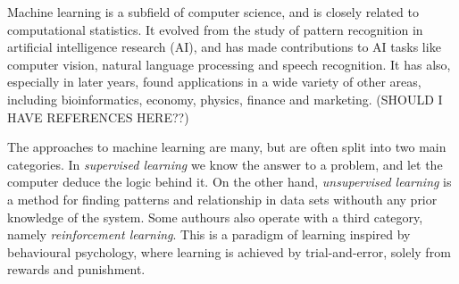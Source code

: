\documentclass[twoside,english]{uiofysmaster}
\begin{document}
Machine learning is a subfield of computer science, and is closely related to computational statistics. 
It evolved from the study of pattern recognition in artificial intelligence research (AI), and has made contributions to
AI tasks like computer vision, natural language processing and speech recognition. It has also, especially in later years, 
found applications in a wide variety of other areas, including bioinformatics, economy, physics, finance and marketing. 
(SHOULD I HAVE REFERENCES HERE??)

The approaches to machine learning are many, but are often split into two main categories. 
In \textit{supervised learning} we know the answer to a problem,
and let the computer deduce the logic behind it. On the other hand, \textit{unsupervised learning}
is a method for finding patterns and relationship in data sets withouth any prior knowledge of the system.
Some authours also operate with a third category, namely \textit{reinforcement learning}. This is a paradigm 
of learning inspired by behavioural psychology, where learning is achieved by trial-and-error, 
solely from rewards and punishment.
\end{document}
